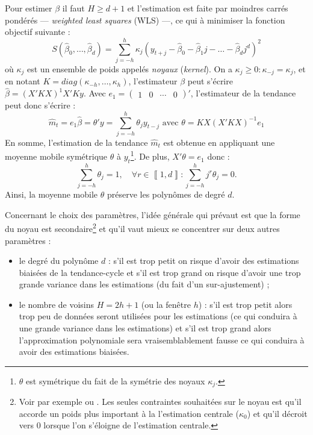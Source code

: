 \documentclass[
  11pt,
  french,
  a4paper]{article}
\newcommand\1{\mathds{1}}
\begin{document}
Pour estimer \(\beta\) il faut \(H\geq d+1\) et l'estimation est faite par moindres carrés pondérés --- \emph{weighted least squares} (WLS) ---, ce qui à minimiser la fonction objectif suivante :
\[
S(\hat{\beta}_{0},\dots,\hat{\beta}_{d})=\sum_{j=-h}^{h}\kappa_{j}(y_{t+j}-\hat{\beta}_{0}-\hat{\beta}_{1}j-\dots-\hat{\beta}_{d}j^{d})^{2}
\]
où \(\kappa_j\) est un ensemble de poids appelés \emph{noyaux} (\emph{kernel}).
On a \(\kappa_j\geq 0:\kappa_{-j}=\kappa_j\), et en notant \(K=diag(\kappa_{-h},\dots,\kappa_{h})\), l'estimateur \(\beta\) peut s'écrire \(\hat{\beta}=(X'KX)^{1}X'Ky\).
Avec \(e_{1}=\begin{pmatrix}1&0&\cdots&0\end{pmatrix}'\), l'estimateur de la tendance peut donc s'écrire :
\[
\hat{m}_{t}=e_{1}\hat{\beta}=\theta'y=\sum_{j=-h}^{h}\theta_{j}y_{t-j}\text{ avec }\theta=KX(X'KX)^{-1}e_{1}
\]
En somme, l'estimation de la tendance \(\hat{m}_{t}\) est obtenue en appliquant une moyenne mobile symétrique \(\theta\) à \(y_t\)\footnote{
  \(\theta\) est symétrique du fait de la symétrie des noyaux \(\kappa_j\).}.
De plus, \(X'\theta=e_{1}\) donc :
\[
\sum_{j=-h}^{h}\theta_{j}=1,\quad\forall r\in\left\llbracket 1,d\right\rrbracket :\sum_{j=-h}^{h}j^{r}\theta_{j}=0.
\]
Ainsi, la moyenne mobile \(\theta\) préserve les polynômes de degré \(d\).

Concernant le choix des paramètres, l'idée générale qui prévaut est que la forme du noyau est secondaire\footnote{
  Voir par exemple \textcite{cleveland1996smoothing} ou \textcite{Loader1999}.
  Les seules contraintes souhaitées sur le noyau est qu'il accorde un poids plus important à la l'estimation centrale (\(\kappa_0\)) et qu'il décroit vers 0 lorsque l'on s'éloigne de l'estimation centrale.} et qu'il vaut mieux se concentrer sur deux autres paramètres :

\begin{itemize}
\item
  le degré du polynôme \(d\) : s'il est trop petit on risque d'avoir des estimations biaisées de la tendance-cycle et s'il est trop grand on risque d'avoir une trop grande variance dans les estimations (du fait d'un sur-ajustement) ;
\item
  le nombre de voisins \(H=2h+1\) (ou la fenêtre \(h\)) : s'il est trop petit alors trop peu de données seront utilisées pour les estimations (ce qui conduira à une grande variance dans les estimations) et s'il est trop grand alors l'approximation polynomiale sera vraisemblablement fausse ce qui conduira à avoir des estimations biaisées.
\end{itemize}
\end{document}

